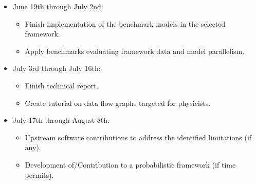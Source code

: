 \begin{itemize}
\begin{itemize}
       \end{itemize}
 \item June 19th through July 2nd:
       \begin{itemize}
        \item [\uncheckedBox] Finish implementation of the benchmark models in the selected framework.
        \item [\uncheckedBox] Apply benchmarks evaluating framework data and model parallelism.
       \end{itemize}
 \item July 3rd through July 16th:
       \begin{itemize}
        \item [\uncheckedBox] Finish technical report.
        \item [\uncheckedBox] Create tutorial on data flow graphs targeted for physicists.
       \end{itemize}
 \item July 17th through August 8th:
       \begin{itemize}
        \item [\uncheckedBox] Upstream software contributions to address the identified limitations (if any).
        \item [\uncheckedBox] Development of/Contribution to a probabilistic framework (if time permits).
       \end{itemize}
\end{itemize}
